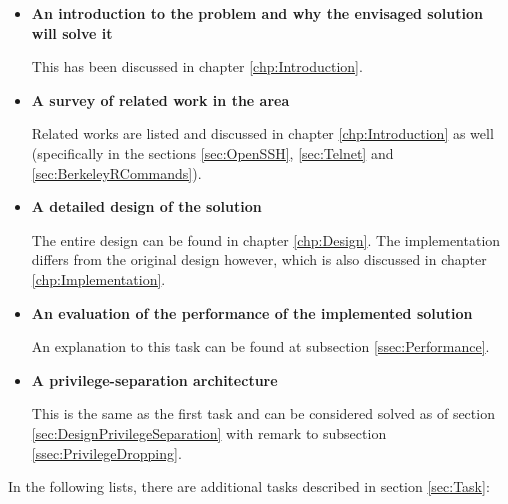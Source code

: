 \documentclass[10pt,a4paper,titlepage,twoside,english,final]{zhawreprt}
\begin{document}
\begin{itemize}
\item \textbf{An introduction to the problem and why the envisaged solution will solve it}

This has been discussed in chapter \ref{chp:Introduction}.

\item \textbf{A survey of related work in the area}

Related works are listed and discussed in chapter \ref{chp:Introduction} as well (specifically in the sections \ref{sec:OpenSSH}, \ref{sec:Telnet} and \ref{sec:BerkeleyRCommands}).

\item \textbf{A detailed design of the solution}

The entire design can be found in chapter \ref{chp:Design}.
The implementation differs from the original design however, which is also discussed in chapter \ref{chp:Implementation}.

\item \textbf{An evaluation of the performance of the implemented solution}

An explanation to this task can be found at subsection \ref{ssec:Performance}.

\item \textbf{A privilege-separation architecture}

This is the same as the first task and can be considered solved as of section \ref{sec:DesignPrivilegeSeparation} with remark to subsection \ref{ssec:PrivilegeDropping}.
\end{itemize}

In the following lists, there are additional tasks described in section \ref{sec:Task}:
\end{document}
